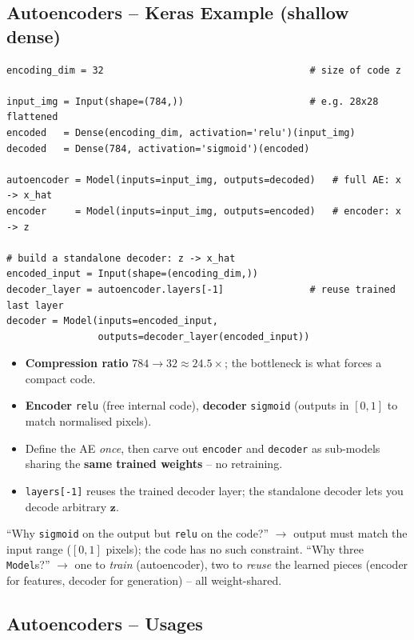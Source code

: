 \documentclass[10pt,a4paper]{article}
\begin{document}
	\subsection{Autoencoders -- Keras Example (shallow dense)}

	\begin{verbatim}
encoding_dim = 32                                    # size of code z

input_img = Input(shape=(784,))                      # e.g. 28x28 flattened
encoded   = Dense(encoding_dim, activation='relu')(input_img)
decoded   = Dense(784, activation='sigmoid')(encoded)

autoencoder = Model(inputs=input_img, outputs=decoded)   # full AE: x -> x_hat
encoder     = Model(inputs=input_img, outputs=encoded)   # encoder: x -> z

# build a standalone decoder: z -> x_hat
encoded_input = Input(shape=(encoding_dim,))
decoder_layer = autoencoder.layers[-1]               # reuse trained last layer
decoder = Model(inputs=encoded_input,
                outputs=decoder_layer(encoded_input))
	\end{verbatim}

	\begin{itemize}[leftmargin=*]
		\item \textbf{Compression ratio} $784 \to 32 \approx 24.5\times$; the bottleneck is what forces a compact code.
		\item \textbf{Encoder} \texttt{relu} (free internal code), \textbf{decoder} \texttt{sigmoid} (outputs in $[0,1]$ to match normalised pixels).
		\item Define the AE \emph{once}, then carve out \texttt{encoder} and \texttt{decoder} as sub-models sharing the \textbf{same trained weights} -- no retraining.
		\item \texttt{layers[-1]} reuses the trained decoder layer; the standalone decoder lets you decode arbitrary $\mathbf{z}$.
	\end{itemize}

	\begin{examtipbox}
		``Why \texttt{sigmoid} on the output but \texttt{relu} on the code?'' $\to$ output must match the input range ($[0,1]$ pixels); the code has no such constraint. ``Why three \texttt{Model}s?'' $\to$ one to \emph{train} (autoencoder), two to \emph{reuse} the learned pieces (encoder for features, decoder for generation) -- all weight-shared.
	\end{examtipbox}

	\subsection{Autoencoders -- Usages}
\end{document}
